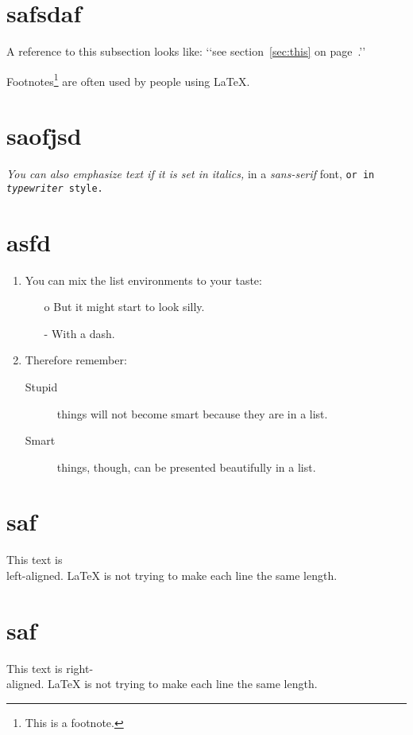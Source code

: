 \documentclass[UTF8]{ctexart}
\begin{document}
\section{safsdaf}

A reference to this subsection
\label{sec:this} looks like:
‘‘see section~\ref{sec:this} on
page~\pageref{sec:this}.’’


Footnotes\footnote{This is
a footnote.} are often used
by people using \LaTeX.

\section{saofjsd}

\textit{You can also
\emph{emphasize} text if
it is set in italics,}
\textsf{in a
\emph{sans-serif} font,}
\texttt{or in
\emph{typewriter} style.}

\section{asfd}

\flushleft
\begin{enumerate}
\item You can mix the list
environments to your taste:
\begin{itemize}
\item[o] But it might start to
look silly.
\item[-] With a dash.
\end{itemize}
\item Therefore remember:
\begin{description}
\item[Stupid] things will not
become smart because they are
in a list.
\item[Smart] things, though, can be
presented beautifully in a list.
\end{description}
\end{enumerate}

\section{saf}

\begin{flushleft}
	This text is\\ left-aligned.
	\LaTeX{} is not trying to make
	each line the same length.
\end{flushleft}

\section{saf}
\begin{flushright}
	This text is right-\\aligned.
	\LaTeX{} is not trying to make
	each line the same length.
\end{flushright}
\end{document}
